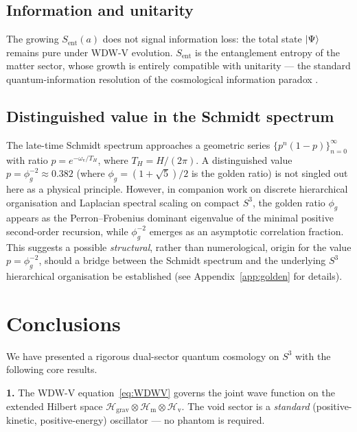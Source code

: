 \documentclass[12pt,a4paper]{article}
\theoremstyle{plain}
\theoremstyle{definition}
\newcommand{\Hil}{\mathscr{H}}
\newcommand{\HilM}{\mathscr{H}_{\mathrm{m}}}
\newcommand{\HilV}{\mathscr{H}_{\mathrm{v}}}
\newcommand{\omv}{\omega_{\mathrm{v}}}
\newcommand{\Sent}{S_{\mathrm{ent}}}
\begin{document}
\subsection{Information and unitarity}

The growing $\Sent(a)$ does not signal information loss: the total state
$\ket\Psi$ remains pure under WDW-V evolution.
$\Sent$ is the entanglement entropy of the matter sector, whose growth
is entirely compatible with unitarity --- the standard quantum-information
resolution of the cosmological information paradox \cite{Almheiri2021}.

\subsection{Distinguished value in the Schmidt spectrum}

The late-time Schmidt spectrum approaches a geometric series
$\{p^n(1-p)\}_{n=0}^\infty$ with ratio $p = e^{-\omv/T_H}$, where
$T_H = H/(2\pi)$.
A distinguished value $p = \phi_g^{-2}\approx 0.382$ (where
$\phi_g = (1+\sqrt{5})/2$ is the golden ratio) is not singled out here
as a physical principle.
However, in companion work on discrete hierarchical organisation and
Laplacian spectral scaling on compact $S^3$, the golden ratio $\phi_g$
appears as the Perron--Frobenius dominant eigenvalue of the minimal
positive second-order recursion, while $\phi_g^{-2}$ emerges as an
asymptotic correlation fraction.
This suggests a possible \emph{structural}, rather than numerological,
origin for the value $p = \phi_g^{-2}$, should a bridge between the
Schmidt spectrum and the underlying $S^3$ hierarchical organisation be
established (see Appendix~\ref{app:golden} for details).

\section{Conclusions}
\label{sec:conclusions}

We have presented a rigorous dual-sector quantum cosmology on $S^3$ with
the following core results.

\medskip\noindent\textbf{1.} The WDW-V equation~\eqref{eq:WDWV} governs
the joint wave function on the extended Hilbert space
$\Hil_{\mathrm{grav}}\otimes\HilM\otimes\HilV$.
The void sector is a \emph{standard} (positive-kinetic, positive-energy)
oscillator --- no phantom is required.
\end{document}

